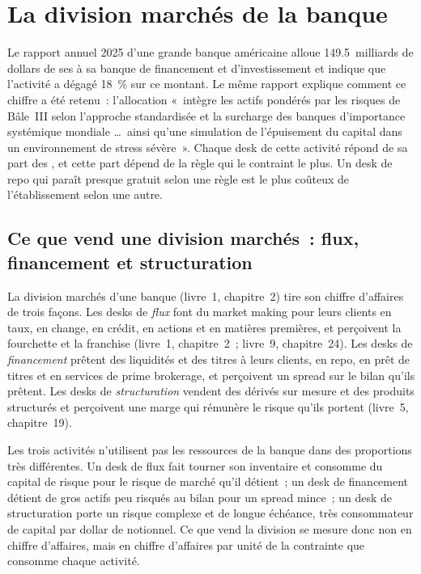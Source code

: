 \chapter{La division marchés de la banque}\label{ch:fm:the-bank-markets-division}

Le rapport annuel 2025 d'une grande banque américaine alloue 149.5~milliards de dollars de ses  à sa banque de financement et d'investissement et indique que
l'activité a dégagé 18~\% sur ce montant. Le même rapport explique comment ce chiffre a été retenu~: l'allocation «~intègre les actifs pondérés par les risques de Bâle~III
selon l'approche standardisée et la surcharge des banques d'importance systémique mondiale \dots\ ainsi qu'une simulation de l'épuisement du capital dans un environnement de stress
sévère~». Chaque desk de cette activité répond de sa part des , et cette part dépend de la règle qui le contraint le plus. Un
desk de repo qui paraît presque gratuit selon une règle est le plus coûteux de l'établissement selon une autre.

\section{Ce que vend une division marchés~: flux, financement et structuration}

La division marchés d'une banque (livre~1, chapitre~2) tire son chiffre d'affaires de trois façons. Les desks de \emph{flux} font du market making pour leurs clients en taux, en change,
en crédit, en actions et en matières premières, et perçoivent la fourchette et la franchise (livre~1, chapitre~2~; livre~9, chapitre~24). Les desks de \emph{financement} prêtent des liquidités
et des titres à leurs clients, en repo, en prêt de titres et en services de prime brokerage, et perçoivent un spread sur le bilan qu'ils prêtent. Les desks de \emph{structuration}
vendent des dérivés sur mesure et des produits structurés et perçoivent une marge qui rémunère le risque qu'ils portent (livre~5, chapitre~19).

Les trois activités n'utilisent pas les ressources de la banque dans des proportions très différentes. Un desk de flux fait tourner son inventaire et consomme du capital de risque pour le
risque de marché qu'il détient~; un desk de financement détient de gros actifs peu risqués au bilan pour un spread mince~; un desk de structuration porte un risque complexe et de longue
échéance, très consommateur de capital par dollar de notionnel. Ce que vend la division se mesure donc non en chiffre d'affaires, mais en chiffre d'affaires par
unité de la contrainte que consomme chaque activité.

